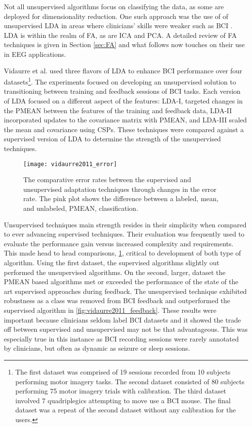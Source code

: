 Not all unsupervised algorithms focus on classifying the data, as some are deployed for dimensionality reduction. One such approach was the use of of unsupervised \ac{LDA} in areas where clinicians' skills were weaker such as \ac{BCI} \cite{Vidaurre2011}. \ac{LDA} is within the realm of \ac{FA}, as are \ac{ICA} and \ac{PCA}.  A detailed review of \ac{FA} techniques is given in Section \ref{sec:FA} and what follows now touches on their use in \ac{EEG} applications.

Vidaurre et al. \cite{Vidaurre2011} used three flavors of \ac{LDA} to enhance \ac{BCI} performance over four datasets\footnote{The first dataset was comprised of 19 sessions recorded from 10 subjects performing motor imagery tasks. The second dataset consisted of 80 subjects performing 75 motor imagery trials with calibration. The third dataset involved 7 quadriplegics attempting to move use a \ac{BCI} mouse. The final dataset was a repeat of the second dataset without any calibration for the users.}. The experiments focused on developing an unsupervised solution to transitioning between training and feedback sessions of \ac{BCI} tasks. Each version of \ac{LDA} focused on a different aspect of the features: LDA-I, targeted changes in the \ac{PMEAN} between the features of the training and feedback data, LDA-II incorporated updates to the covariance matrix with \ac{PMEAN}, and LDA-III scaled the mean and covariance  using \acp{CSP}. These techniques were compared against a supervised version of \ac{LDA} to determine the strength of the unsupervised techniques.

\begin{figure}[ht]
\centering
\texttt{[image: vidaurre2011\_error]}
\caption[BCI Calibration Error]{The comparative error rates between the supervised and unsupervised adaptation techniques through changes in the error rate. The pink plot shows the difference between a labeled, mean, and unlabeled, \ac{PMEAN}, classification.}
\label{fig:vidaurre2011_error}
\end{figure}

Unsupervised techniques main strength resides in their simplicity when compared to ever advancing supervised techniques. Their evaluation was frequently used to evaluate the performance gain versus increased complexity and requirements. This made head to head comparisons, \cref{fig:vidaurre2011_error}, critical to development of both type of algorithm. Using the first dataset, the supervised algorithms slightly out performed the unsupervised algorithms. On the second, larger, dataset the \ac{PMEAN} based algorithms met or exceeded the performance of the state of the art supervised approaches during feedback. The unsupervised technique exhibited robustness as a class was removed from \ac{BCI} feedback and outperformed the supervised algorithm in \cref{fig:vidaurre2011_feedback}. These results were important because clinicians seldom label \ac{BCI} datasets and it showed the trade off between supervised and unsupervised may not be that advantageous. This was especially true in this instance as \ac{BCI} recording sessions were rarely annotated by clinicians, but often as dynamic as seizure or sleep sessions.

